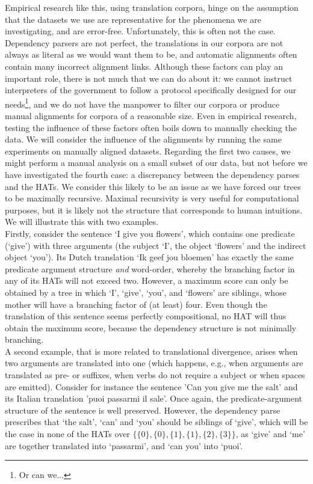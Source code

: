 \documentclass{report}
\theoremstyle{definition}
\theoremstyle{plain}
\begin{document}
Empirical research like this, using translation corpora, hinge on the assumption that the datasets we use are representative for the phenomena we are investigating, and are error-free. Unfortunately, this is often not the case. Dependency parsers are not perfect, the translations in our corpora are not always as literal as we would want them to be, and automatic alignments often contain many incorrect alignment links. Although these factors can play an important role, there is not much that we can do about it: we cannot instruct interpreters of the government to follow a protocol specifically designed for our needs\footnote{Or can we...}, and we do not have the manpower to filter our corpora or produce manual alignments for corpora of a reasonable size. Even in empirical research, testing the influence of these factors often boils down to manually checking the data. We will consider the influence of the alignments by running the same experiments on manually aligned datasets. Regarding the first two causes, we might perform a manual analysis on a small subset of our data, but not before we have investigated the fourth case: a discrepancy between the dependency parses and the HATs. We consider this likely to be an issue as we have forced our trees to be maximally recursive. Maximal recursivity is very useful for computational purposes, but it is likely not the structure that corresponds to human intuitions. We will illustrate this with two examples.\\
Firstly, consider the sentence `I give you flowers', which contains one predicate (`give') with three arguments (the subject `I', the object `flowers' and the indirect object `you'). Its Dutch translation `Ik geef jou bloemen' has exactly the same predicate argument structure \textit{and} word-order, whereby the branching factor in any of its HATs will not exceed two. However, a maximum score can only be obtained by a tree in which `I', `give', `you', and `flowers' are siblings, whose mother will have a branching factor of (at least) four. Even though the translation of this sentence seems perfectly compositional, no HAT will thus obtain the maximum score, because the dependency structure is not minimally branching.\\
A second example, that is more related to translational divergence, arises when two arguments are translated into one (which happens, e.g., when arguments are translated as pre- or suffixes, when verbs do not require a subject or when spaces are emitted). Consider for instance the sentence 'Can you give me the salt' and its Italian translation 'puoi passarmi il sale'. Once again, the predicate-argument structure of the sentence is well preserved. However, the dependency parse prescribes that `the salt', `can' and `you' should be siblings of `give', which will be the case in none of the HATs over $\{\{0\},\{0\},\{1\},\{1\},\{2\},\{3\}\}$, as `give' and `me' are together translated into `passarmi', and `can you' into `puoi'.\\
\end{document}
